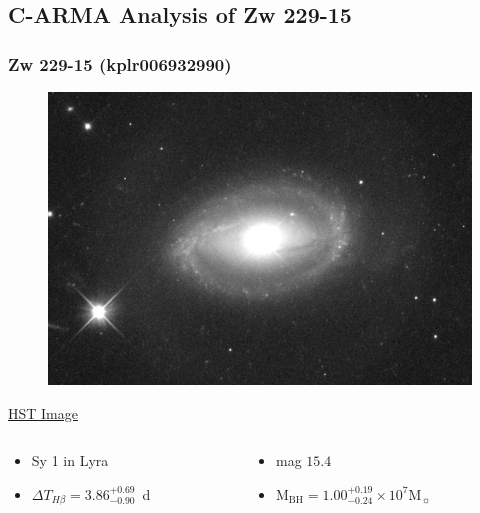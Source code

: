 \documentclass[hyperref={pdfpagelabels=false}]{beamer}
\begin{document}
\subsection{C-ARMA Analysis of Zw 229-15}

\begin{frame}
\frametitle{Zw 229-15 (kplr006932990)}
  \begin{figure}
    \includegraphics[scale=0.035]{images/Zw229-15_Crop.jpg}
  \end{figure}
  \begin{center}
    \href{https://archive.stsci.edu/}{{\tiny HST Image}}
  \end{center}
  \begin{columns}
    \begin{column}{0.5\textwidth}
      \begin{itemize}
        \item Sy 1 in Lyra
        \item $\Delta T_{H\beta} = 3.86^{+0.69}_{-0.90}$~d
      \end{itemize}
    \end{column}
    \begin{column}{0.5\textwidth}
      \begin{itemize}
        \item mag $15.4$
        \item $\mathrm{M}_{\mathrm{BH}} = 1.00^{+0.19}_{-0.24} \times 10^{7} \mathrm{M}_{\sun}$
      \end{itemize}
    \end{column}
  \end{columns}
  \begin{center}
    {\tiny \citep{Barth11}}
  \end{center}
\end{frame}
\end{document}
